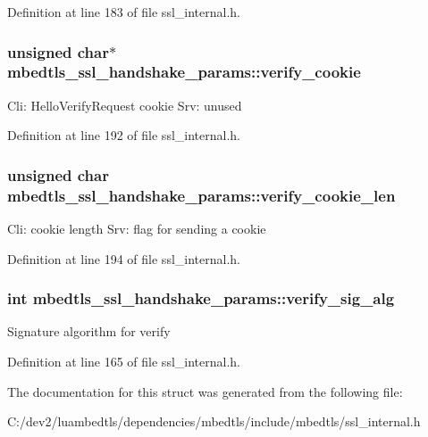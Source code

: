 Definition at line 183 of file ssl\-\_\-internal.\-h.

\hypertarget{structmbedtls__ssl__handshake__params_a95f37efbc53f2f542632527f5c9931af}{
\subsubsection[{verify\-\_\-cookie}]{\setlength{\rightskip}{0pt plus 5cm}unsigned char$\ast$ mbedtls\-\_\-ssl\-\_\-handshake\-\_\-params\-::verify\-\_\-cookie}}\label{structmbedtls__ssl__handshake__params_a95f37efbc53f2f542632527f5c9931af}
Cli\-: Hello\-Verify\-Request cookie Srv\-: unused 

Definition at line 192 of file ssl\-\_\-internal.\-h.

\hypertarget{structmbedtls__ssl__handshake__params_a12cd286ea50d184e53a51c3cc60a8a06}{
\subsubsection[{verify\-\_\-cookie\-\_\-len}]{\setlength{\rightskip}{0pt plus 5cm}unsigned char mbedtls\-\_\-ssl\-\_\-handshake\-\_\-params\-::verify\-\_\-cookie\-\_\-len}}\label{structmbedtls__ssl__handshake__params_a12cd286ea50d184e53a51c3cc60a8a06}
Cli\-: cookie length Srv\-: flag for sending a cookie 

Definition at line 194 of file ssl\-\_\-internal.\-h.

\hypertarget{structmbedtls__ssl__handshake__params_ab950ce283cc477ea1a246689ecd2a22d}{
\subsubsection[{verify\-\_\-sig\-\_\-alg}]{\setlength{\rightskip}{0pt plus 5cm}int mbedtls\-\_\-ssl\-\_\-handshake\-\_\-params\-::verify\-\_\-sig\-\_\-alg}}\label{structmbedtls__ssl__handshake__params_ab950ce283cc477ea1a246689ecd2a22d}
Signature algorithm for verify 

Definition at line 165 of file ssl\-\_\-internal.\-h.



The documentation for this struct was generated from the following file\-:\begin{DoxyCompactItemize}
\item 
C\-:/dev2/luambedtls/dependencies/mbedtls/include/mbedtls/ssl\-\_\-internal.\-h\end{DoxyCompactItemize}
